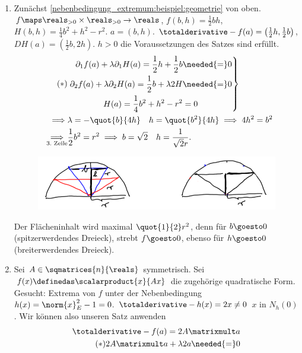 \begin{beispiele*}
  \begin{enumerate}
    \item Zunächst \ref{nebenbedingung_extremum:beispiel:geometrie} von oben. \( f\maps \reals_{>0}\times \reals_{>0}\to \reals \), \( f(b,h)=\frac{1}{2}bh \), \( H(b,h)=\frac{1}{4}b^2+h^2-r^2 \). \( a=(b,h) \). \( \totalderivative-{f}(a)=\left( \frac{1}{2}h,\frac{1}{2}b \right) \), \( DH(a)=\left( \frac{1}{2}b, 2h \right) \). \( h>0 \) \timplies die Voraussetzungen des Satzes sind erfüllt.
    \begin{align*}
      \tag{\(*\)}&\left.\begin{aligned}
        \partial_1 f(a)+\lambda \partial_1 H(a)=\frac{1}{2}h+\frac{1}{2}b&\needed{=}0\\
        \partial_2 f(a)+\lambda\partial_2 H(a)=\frac{1}{2}b+\lambda 2H&\needed{=}0\\
        H(a)=\frac{1}{4}b^2+h^2-r^2&=0
      \end{aligned}\right\}\\
      \implies &\lambda=-\quot{b}{4h}\quad h=\quot{b^2}{4h} \implies 4h^2=b^2\\
      \underset{\text{3.\ Zeile}}{\implies} &\frac{1}{2}b^2=r^2\implies b=\sqrt{2}\quad h=\frac{1}{\sqrt{2}r}.
    \end{align*}
    \begin{figure}[H]
      \centering
      \includegraphics[width=0.5\linewidth]{figures/dreiecksmaximierung_antwort}
      \caption*{}
      \label{fig:dreiecksmaximierung_antwort}
    \end{figure}
    Der Flächeninhalt wird maximal \( \quot{1}{2}r^2 \), denn für \( b\goesto 0 \) (spitzerwerdendes Dreieck), strebt \( f\goesto 0 \), ebenso für \( h\goesto 0 \) (breiterwerdendes Dreieck).
    \item Sei \( A\in \sqmatrices{n}{\reals} \) symmetrisch. Sei \( f(x)\definedas \scalarproduct{x}{Ax} \) die zugehörige quadratische Form. Gesucht: Extrema von \( f \) unter der Nebenbedingung \( h(x)=\norm{x}_E^2-1=0 \). \( \totalderivative-{h}(x)=2x\neq 0 \) \tforall \( x \) in \( N_h(0) \). Wir können also unseren Satz anwenden
    \begin{align*}
      \totalderivative-{f}(a)=2A\matrixmult a\\
      \tag{\(*\)} 2A\matrixmult a+\lambda 2a\needed{=}0

\end{align*}
\end{enumerate}
\end{beispiele*}
